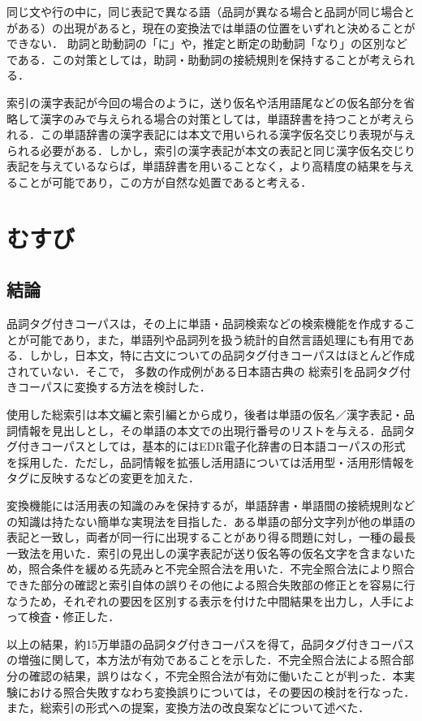 同じ文や行の中に，同じ表記で異なる語（品詞が異なる場合と品詞が同じ場合とがある）の出現があると，現在の変換法では単語の位置をいずれと決めることができない．
助詞と助動詞の「に」や，推定と断定の助動詞「なり」の区別などである．この対策としては，助詞・助動詞の接続規則を保持することが考えられる．

索引の漢字表記が今回の場合のように，送り仮名や活用語尾などの仮名部分を省略して漢字のみで与えられる場合の対策としては，単語辞書を持つことが考えられる．この単語辞書の漢字表記には本文で用いられる漢字仮名交じり表現が与えられる必要がある．しかし，索引の漢字表記が本文の表記と同じ漢字仮名交じり表記を与えているならば，単語辞書を用いることなく，より高精度の結果を与えることが可能であり，この方が自然な処置であると考える．

\section{むすび}
\label{sec:musubi}
\subsection{結論}
\label{sec:Conclusion}
品詞タグ付きコーパスは，その上に単語・品詞検索などの検索機能を作成することが可能であり，また，単語列や品詞列を扱う統計的自然言語処理にも有用である．しかし，日本文，特に古文についての品詞タグ付きコーパスはほとんど作成されていない．そこで，
多数の作成例がある日本語古典の
総索引を品詞タグ付きコーパスに変換する方法を検討した．

使用した総索引は本文編と索引編とから成り，後者は単語の仮名／漢字表記・品詞情報を見出しとし，その単語の本文での出現行番号のリストを与える．品詞タグ付きコーパスとしては，基本的にはEDR電子化辞書の日本語コーパスの形式を採用した．ただし，品詞情報を拡張し活用語については活用型・活用形情報をタグに反映するなどの変更を加えた．

変換機能には活用表の知識のみを保持するが，単語辞書・単語間の接続規則などの知識は持たない簡単な実現法を目指した．ある単語の部分文字列が他の単語の表記と一致し，両者が同一行に出現することがあり得る問題に対し，一種の最長一致法を用いた．索引の見出しの漢字表記が送り仮名等の仮名文字を含まないため，照合条件を緩める先読みと不完全照合法を用いた．不完全照合法により照合できた部分の確認と索引自体の誤りその他による照合失敗部の修正とを容易に行なうため，それぞれの要因を区別する表示を付けた中間結果を出力し，人手によって検査・修正した．

以上の結果，約15万単語の品詞タグ付きコーパスを得て，品詞タグ付きコーパスの増強に関して，本方法が有効であることを示した．不完全照合法による照合部分の確認の結果，誤りはなく，不完全照合法が有効に働いたことが判った．本実験における照合失敗すなわち変換誤りについては，その要因の検討を行なった．また，総索引の形式への提案，変換方法の改良案などについて述べた．


